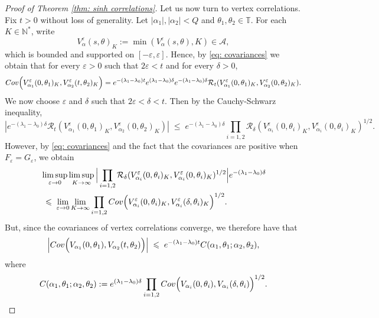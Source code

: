 \documentclass[10pt,a4paper]{amsart}
\def\eps{\varepsilon}
\renewcommand{\leq}{\;\leqslant\;}                   %
\begin{document}
\begin{proof}[Proof of Theorem \ref{thm: sinh correlations}]
Let us now turn to vertex correlations. Fix $t>0$ without loss of generality. Let $|\alpha_1|,|\alpha_2|<Q$ and $\theta_1,\theta_2 \in \mathbb T$. For each $K \in \mathbb N^*$, write
\begin{equation}
V_{\alpha}^\eps(s,\theta)_K:= \min(V_{\alpha}^\eps(s,\theta),K) \in \mathcal A,
\end{equation}
which is bounded and supported on $[-\eps, \eps]$. Hence, by \eqref{eq: covariances} we obtain that for every $\eps > 0$ such that $2\eps < t$ and for every $\delta > 0$,
\begin{equation}
{\rm Cov}\Big(V_{\alpha_1}^\eps(0,\theta_1)_K,  V_{\alpha_2}^\eps(t,\theta_2)_K  \Big) = e^{-(\lambda_1-\lambda_0)t} e^{(\lambda_1-\lambda_0)\delta} e^{-(\lambda_1-\lambda_0)\delta }\mathcal R_t(V_{\alpha_1}^\eps(0,\theta_1)_K,  V_{\alpha_2}^\eps(0,\theta_2)_K).
\end{equation}
We now choose $\eps$ and $\delta$ such that $2\eps < \delta < t$. Then by the Cauchy-Schwarz inequality, 
\begin{equation}
|e^{-(\lambda_1-\lambda_0)\delta }\mathcal R_t(V_{\alpha_1}^\eps(0,\theta_1)_K,  V_{\alpha_2}^\eps(0,\theta_2)_K)| \leq e^{-(\lambda_1-\lambda_0)\delta }\prod_{i=1,2} \mathcal R_\delta( 	V_{\alpha_i}^\eps(0,\theta_i)_K, V_{\alpha_i}^\eps(0,\theta_i)_K)^{1/2}.
\end{equation}
However, by \eqref{eq: covariances} and the fact that the covariances are positive when $F_\eps=G_\eps$, we obtain 
\begin{align*}
& \limsup_{\eps \rightarrow 0}\limsup_{K \rightarrow \infty}\Big|\prod_{i=1,2} \mathcal R_\delta( 	V_{\alpha_i}^\eps(0,\theta_i)_K, V_{\alpha_i}^\eps(0,\theta_i)_K)^{1/2}\Big|e^{-(\lambda_1-\lambda_0)\delta }	\\
& \leq \lim_{\eps \rightarrow 0} \lim_{K \rightarrow \infty} \prod_{i=1,2} {\rm Cov}\Big(V_{\alpha_i}^\eps(0,\theta_i)_K, V_{\alpha_i}^\eps(\delta,\theta_i)_K  \Big)^{1/2}.
\end{align*}
But, since the covariances of vertex correlations converge, we therefore have that
\begin{equation}
\Big|{\rm Cov}\Big(V_{\alpha_1}(0,\theta_1), V_{\alpha_2}(t,\theta_2)\Big)\Big| \leq e^{-(\lambda_1-\lambda_0)t} C(\alpha_1,\theta_1; \alpha_2,\theta_2),	
\end{equation}
where
\begin{equation}
C(\alpha_1,\theta_1;\alpha_2,\theta_2):= e^{(\lambda_1-\lambda_0)\delta} \prod_{i=1,2}{\rm Cov}\Big(V_{\alpha_i}(0,\theta_i), V_{\alpha_i}(\delta,\theta_i) \Big)^{1/2}. 	\qedhere
\end{equation}
\end{proof}
\end{document}
